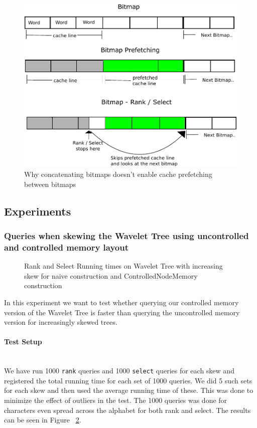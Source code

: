 \begin{figure}[h]
\caption{Why concatenating bitmaps doesn't enable cache prefetching between bitmaps}
\label{fig:QueryPrefetchFigure}
\includegraphics[width=\textwidth]{QueryPrefetchFigure.pdf}
\end{figure}



\subsection{Experiments}

\subsubsection{Queries when skewing the Wavelet Tree using uncontrolled and controlled memory layout}

\begin{figure}
\caption{Rank and Select Running times on Wavelet Tree with increasing skew for naive construction and ControlledNodeMemory construction}
\label{fig:NaiveRankSelectSkewRunningTime}

\end{figure}


In this experiment we want to test whether querying our controlled memory version of the Wavelet Tree is faster than querying the uncontrolled memory version for increasingly skewed trees. 

\paragraph{Test Setup}~\\
We have run 1000 \texttt{rank} queries and 1000 \texttt{select} queries for each skew and registered the total running time for each set of 1000 queries. 
We did 5 such sets for each skew and then used the average running time of these. 
This was done to minimize the effect of outliers in the test. The 1000 queries was done for characters even spread across the alphabet for both rank and select. The results can be seen in Figure ~\ref{fig:NaiveRankSelectSkewRunningTime}.

